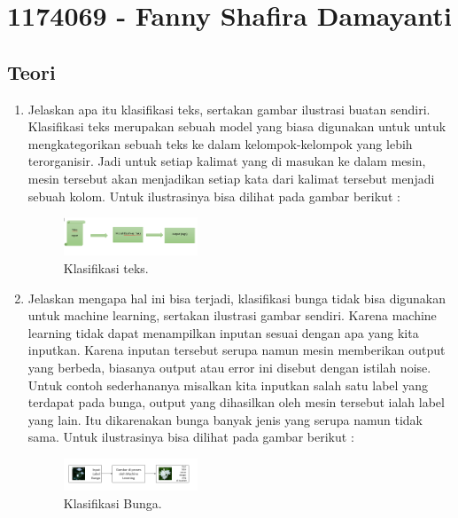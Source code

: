 \section{1174069 - Fanny Shafira Damayanti}
\subsection{Teori}
\begin{enumerate}

	\item Jelaskan apa itu klasifikasi teks, sertakan gambar ilustrasi buatan sendiri.
	\hfill\break
	Klasifikasi teks merupakan sebuah model yang biasa digunakan untuk untuk mengkategorikan sebuah teks ke dalam kelompok-kelompok yang lebih terorganisir. Jadi untuk setiap kalimat yang di masukan ke dalam mesin, mesin tersebut akan menjadikan setiap kata dari kalimat tersebut menjadi sebuah kolom. Untuk ilustrasinya bisa dilihat pada gambar berikut : 

	\begin{figure}[H]
	\centering
		\includegraphics[width=4cm]{figures/1174069/4/materi/1.PNG}
		\caption{Klasifikasi teks.}
	\end{figure}

	\item Jelaskan mengapa hal ini bisa terjadi, klasifikasi bunga tidak bisa digunakan untuk machine learning, sertakan ilustrasi gambar sendiri.
	\hfill\break
	Karena machine learning tidak dapat menampilkan inputan sesuai dengan apa yang kita inputkan. Karena inputan tersebut serupa namun mesin memberikan output yang berbeda, biasanya output atau error ini disebut dengan istilah noise. Untuk contoh sederhananya misalkan kita inputkan salah satu label yang terdapat pada bunga, output yang dihasilkan oleh mesin tersebut ialah label yang lain. Itu dikarenakan bunga banyak jenis yang serupa namun tidak sama. Untuk ilustrasinya bisa dilihat pada gambar berikut : 

	\begin{figure}[H]
	\centering
		\includegraphics[width=4cm]{figures/1174069/4/materi/2.PNG}
		\caption{Klasifikasi Bunga.}
	\end{figure}
	

\end{enumerate}
